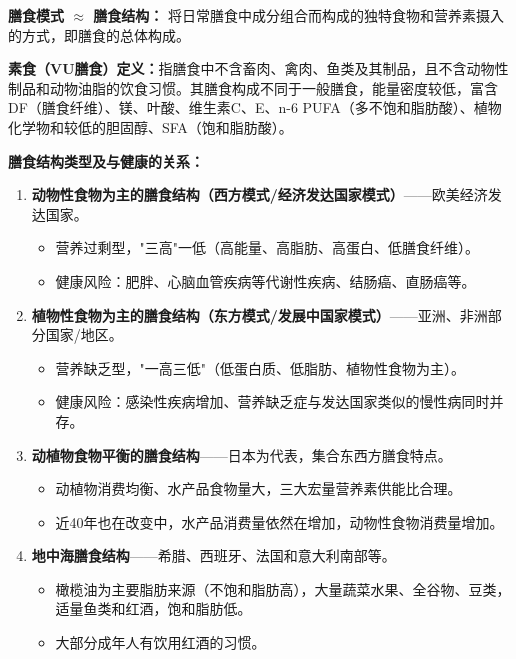 \begin{defbox}
\textbf{膳食模式 $\approx$ 膳食结构：}
将日常膳食中成分组合而构成的独特食物和营养素摄入的方式，即膳食的总体构成。

\textbf{素食（VU膳食）定义：}指膳食中不含畜肉、禽肉、鱼类及其制品，且不含动物性制品和动物油脂的饮食习惯。其膳食构成不同于一般膳食，能量密度较低，富含DF（膳食纤维）、镁、叶酸、维生素C、E、n-6 PUFA（多不饱和脂肪酸）、植物化学物和较低的胆固醇、SFA（饱和脂肪酸）。
\end{defbox}

\begin{keybox}
\textbf{膳食结构类型及与健康的关系：}

\begin{enumerate}[leftmargin=*]
    \item \textbf{动物性食物为主的膳食结构（西方模式/经济发达国家模式）}——欧美经济发达国家。
    \begin{itemize}
        \item 营养过剩型，"三高"一低（高能量、高脂肪、高蛋白、低膳食纤维）。
        \item 健康风险：肥胖、心脑血管疾病等代谢性疾病、结肠癌、直肠癌等。
    \end{itemize}

    \item \textbf{植物性食物为主的膳食结构（东方模式/发展中国家模式）}——亚洲、非洲部分国家/地区。
    \begin{itemize}
        \item 营养缺乏型，"一高三低"（低蛋白质、低脂肪、植物性食物为主）。
        \item 健康风险：感染性疾病增加、营养缺乏症与发达国家类似的慢性病同时并存。
    \end{itemize}

    \item \textbf{动植物食物平衡的膳食结构}——日本为代表，集合东西方膳食特点。
    \begin{itemize}
        \item 动植物消费均衡、水产品食物量大，三大宏量营养素供能比合理。
        \item 近40年也在改变中，水产品消费量依然在增加，动物性食物消费量增加。
    \end{itemize}

    \item \textbf{地中海膳食结构}——希腊、西班牙、法国和意大利南部等。
    \begin{itemize}
        \item 橄榄油为主要脂肪来源（不饱和脂肪高），大量蔬菜水果、全谷物、豆类，适量鱼类和红酒，饱和脂肪低。
        \item 大部分成年人有饮用红酒的习惯。
    \end{itemize}
\end{enumerate}
\end{keybox}

